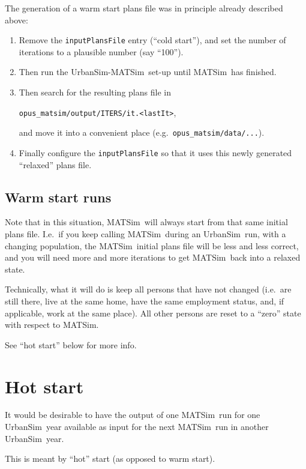\documentclass{article}
\def\matsim{MATSim}
\def\urbansim{UrbanSim}
\begin{document}
The generation of a warm start plans file was in principle already
described above:
\begin{enumerate}

\item Remove the \verb$inputPlansFile$ entry (``cold start''), and set
the number of iterations to a plausible number (say ``100'').

\item Then run the \urbansim-\matsim\ set-up until \matsim\ has
finished.

\item
Then search for the resulting plans file in

\verb$opus_matsim/output/ITERS/it.<lastIt>$, 

and move it into a convenient place (e.g.\
\verb$opus_matsim/data/...$).

\item Finally configure the \verb$inputPlansFile$ so that it uses this
newly generated ``relaxed'' plans file.

\end{enumerate}

\subsection{Warm start runs}

Note that in this situation, \matsim\ will always start from that same
initial plans file.  I.e.\ if you keep calling \matsim\ during an
\urbansim\ run, with a changing population, the \matsim\ initial plans
file will be less and less correct, and you will need more and more
iterations to get \matsim\ back into a relaxed state.

Technically, what it will do is keep all persons that have not changed
(i.e.\ are still there, live at the same home, have the same
employment status, and, if applicable, work at the same place).  All
other persons are reset to a ``zero'' state with respect to \matsim.

See ``hot start'' below for more info.


\section{Hot start}

It would be desirable to have the output of one \matsim\ run for one
\urbansim\ year available as input for the next \matsim\ run in
another \urbansim\ year.  

This is meant by ``hot'' start (as opposed to warm start).
\end{document}

